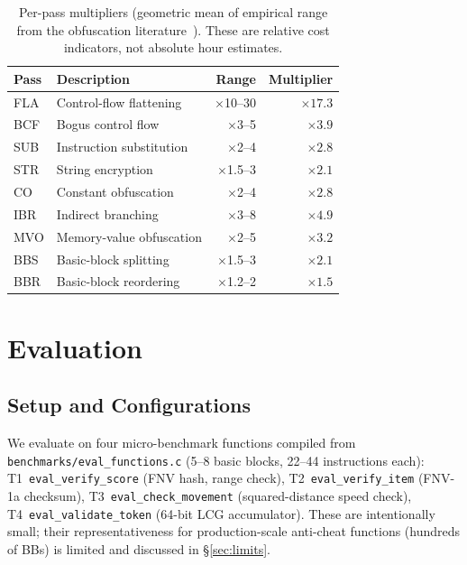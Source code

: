\documentclass[conference]{IEEEtran}
\begin{document}
\begin{table}[t]
\centering
\caption{Per-pass multipliers (geometric mean of empirical range from
  the obfuscation literature~\cite{collberg1997taxonomy,xu2017cifar}).
  These are relative cost indicators, not absolute hour estimates.}
\label{tab:multipliers}
\footnotesize
\begin{tabular}{llrr}
\toprule
Pass & Description & Range & Multiplier \\
\midrule
FLA & Control-flow flattening   & $\times$10--30  & $\times17.3$ \\
BCF & Bogus control flow        & $\times$3--5    & $\times3.9$  \\
SUB & Instruction substitution  & $\times$2--4    & $\times2.8$  \\
STR & String encryption         & $\times$1.5--3  & $\times2.1$  \\
CO  & Constant obfuscation      & $\times$2--4    & $\times2.8$  \\
IBR & Indirect branching        & $\times$3--8    & $\times4.9$  \\
MVO & Memory-value obfuscation  & $\times$2--5    & $\times3.2$  \\
BBS & Basic-block splitting     & $\times$1.5--3  & $\times2.1$  \\
BBR & Basic-block reordering    & $\times$1.2--2  & $\times1.5$  \\
\bottomrule
\end{tabular}
\end{table}

\section{Evaluation}
\label{sec:eval}

\subsection{Setup and Configurations}

We evaluate on four micro-benchmark functions compiled from
\texttt{benchmarks/eval\_functions.c} (5--8 basic blocks, 22--44
instructions each):
T1~\texttt{eval\_verify\_score} (FNV hash, range check),
T2~\texttt{eval\_verify\_item} (FNV-1a checksum),
T3~\texttt{eval\_check\_movement} (squared-distance speed check),
T4~\texttt{eval\_validate\_token} (64-bit LCG accumulator).
These are intentionally small; their representativeness for
production-scale anti-cheat functions (hundreds of BBs) is limited
and discussed in \S\ref{sec:limits}.
\end{document}
